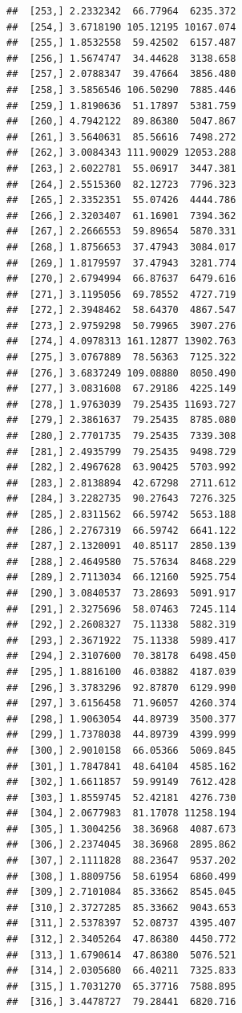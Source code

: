 \documentclass[article]{jss}\usepackage[]{graphicx}\usepackage[]{xcolor}
\makeatletter
\newenvironment{kframe}{%
 \def\at@end@of@kframe{}%
 \ifinner\ifhmode%
  \def\at@end@of@kframe{\end{minipage}}%
  \begin{minipage}{\columnwidth}%
 \fi\fi%
 \def\FrameCommand##1{\hskip\@totalleftmargin \hskip-\fboxsep
 \colorbox{shadecolor}{##1}\hskip-\fboxsep
     \hskip-\linewidth \hskip-\@totalleftmargin \hskip\columnwidth}%
 \MakeFramed {\advance\hsize-\width
   \@totalleftmargin\z@ \linewidth\hsize
   \@setminipage}}%
 {\par\unskip\endMakeFramed%
 \at@end@of@kframe}
\newenvironment{knitrout}{}{} %
\makeatother
\begin{document}
\begin{knitrout}
\begin{kframe}
\begin{verbatim}
##  [253,] 2.2332342  66.77964  6235.372
##  [254,] 3.6718190 105.12195 10167.074
##  [255,] 1.8532558  59.42502  6157.487
##  [256,] 1.5674747  34.44628  3138.658
##  [257,] 2.0788347  39.47664  3856.480
##  [258,] 3.5856546 106.50290  7885.446
##  [259,] 1.8190636  51.17897  5381.759
##  [260,] 4.7942122  89.86380  5047.867
##  [261,] 3.5640631  85.56616  7498.272
##  [262,] 3.0084343 111.90029 12053.288
##  [263,] 2.6022781  55.06917  3447.381
##  [264,] 2.5515360  82.12723  7796.323
##  [265,] 2.3352351  55.07426  4444.786
##  [266,] 2.3203407  61.16901  7394.362
##  [267,] 2.2666553  59.89654  5870.331
##  [268,] 1.8756653  37.47943  3084.017
##  [269,] 1.8179597  37.47943  3281.774
##  [270,] 2.6794994  66.87637  6479.616
##  [271,] 3.1195056  69.78552  4727.719
##  [272,] 2.3948462  58.64370  4867.547
##  [273,] 2.9759298  50.79965  3907.276
##  [274,] 4.0978313 161.12877 13902.763
##  [275,] 3.0767889  78.56363  7125.322
##  [276,] 3.6837249 109.08880  8050.490
##  [277,] 3.0831608  67.29186  4225.149
##  [278,] 1.9763039  79.25435 11693.727
##  [279,] 2.3861637  79.25435  8785.080
##  [280,] 2.7701735  79.25435  7339.308
##  [281,] 2.4935799  79.25435  9498.729
##  [282,] 2.4967628  63.90425  5703.992
##  [283,] 2.8138894  42.67298  2711.612
##  [284,] 3.2282735  90.27643  7276.325
##  [285,] 2.8311562  66.59742  5653.188
##  [286,] 2.2767319  66.59742  6641.122
##  [287,] 2.1320091  40.85117  2850.139
##  [288,] 2.4649580  75.57634  8468.229
##  [289,] 2.7113034  66.12160  5925.754
##  [290,] 3.0840537  73.28693  5091.917
##  [291,] 2.3275696  58.07463  7245.114
##  [292,] 2.2608327  75.11338  5882.319
##  [293,] 2.3671922  75.11338  5989.417
##  [294,] 2.3107600  70.38178  6498.450
##  [295,] 1.8816100  46.03882  4187.039
##  [296,] 3.3783296  92.87870  6129.990
##  [297,] 3.6156458  71.96057  4260.374
##  [298,] 1.9063054  44.89739  3500.377
##  [299,] 1.7378038  44.89739  4399.999
##  [300,] 2.9010158  66.05366  5069.845
##  [301,] 1.7847841  48.64104  4585.162
##  [302,] 1.6611857  59.99149  7612.428
##  [303,] 1.8559745  52.42181  4276.730
##  [304,] 2.0677983  81.17078 11258.194
##  [305,] 1.3004256  38.36968  4087.673
##  [306,] 2.2374045  38.36968  2895.862
##  [307,] 2.1111828  88.23647  9537.202
##  [308,] 1.8809756  58.61954  6860.499
##  [309,] 2.7101084  85.33662  8545.045
##  [310,] 2.3727285  85.33662  9043.653
##  [311,] 2.5378397  52.08737  4395.407
##  [312,] 2.3405264  47.86380  4450.772
##  [313,] 1.6790614  47.86380  5076.521
##  [314,] 2.0305680  66.40211  7325.833
##  [315,] 1.7031270  65.37716  7588.895
##  [316,] 3.4478727  79.28441  6820.716

\end{verbatim}
\end{kframe}
\end{knitrout}
\end{document}
